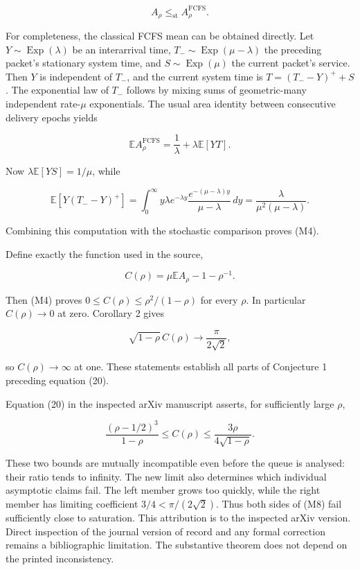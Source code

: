 \documentclass[
  11pt,
  a4paper,
]{scrartcl}
\begin{document}
\[
A_\rho\leq_{\mathrm{st}} A_\rho^{\mathrm{FCFS}}.
\tag{M6}
\]

For completeness, the classical FCFS mean can be obtained directly. Let
\(Y\sim\operatorname{Exp}(\lambda)\) be an interarrival time,
\(T_-\sim\operatorname{Exp}(\mu-\lambda)\) the preceding packet's
stationary system time, and \(S\sim\operatorname{Exp}(\mu)\) the current
packet's service. Then \(Y\) is independent of \(T_-\), and the current
system time is \(T=(T_--Y)^++S\). The exponential law of \(T_-\) follows
by mixing sums of geometric-many independent rate-\(\mu\) exponentials.
The usual area identity between consecutive delivery epochs yields

\[
\mathbb EA_\rho^{\mathrm{FCFS}}
=\frac1\lambda+\lambda\mathbb E[YT].
\]

Now \(\lambda\mathbb E[YS]=1/\mu\), while

\[
\mathbb E[Y(T_--Y)^+]
=\int_0^\infty y\lambda e^{-\lambda y}
\frac{e^{-(\mu-\lambda)y}}{\mu-\lambda}\,dy
=\frac{\lambda}{\mu^2(\mu-\lambda)}.
\]

Combining this computation with the stochastic comparison proves (M4).

Define exactly the function used in the source,

\[
C(\rho)=\mu\mathbb EA_\rho-1-\rho^{-1}.
\]

Then (M4) proves \(0\leq C(\rho)\leq\rho^2/(1-\rho)\) for every
\(\rho\). In particular \(C(\rho)\to0\) at zero. Corollary 2 gives

\[
\sqrt{1-\rho}\,C(\rho)\longrightarrow\frac\pi{2\sqrt2},
\tag{M7}
\]

so \(C(\rho)\to\infty\) at one. These statements establish all parts of
Conjecture 1 preceding equation (20).

Equation (20) in the inspected arXiv manuscript asserts, for
sufficiently large \(\rho\),

\[
\frac{(\rho-1/2)^3}{1-\rho}\leq C(\rho)
\leq\frac{3\rho}{4\sqrt{1-\rho}}.
\tag{M8}
\]

These two bounds are mutually incompatible even before the queue is
analysed: their ratio tends to infinity. The new limit also determines
which individual asymptotic claims fail. The left member grows too
quickly, while the right member has limiting coefficient
\(3/4<\pi/(2\sqrt2)\). Thus both sides of (M8) fail sufficiently close
to saturation. This attribution is to the inspected arXiv version.
Direct inspection of the journal version of record and any formal
correction remains a bibliographic limitation. The substantive theorem
does not depend on the printed inconsistency.
\end{document}
